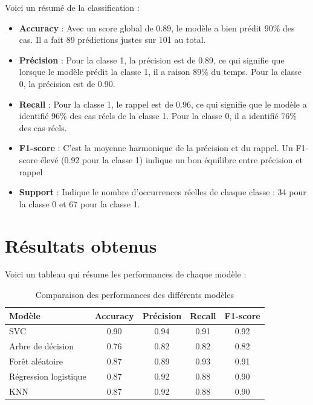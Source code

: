 Voici un résumé de la classification :
\begin{itemize}
	\item \textbf{Accuracy} : Avec un score global de 0.89, le modèle a bien prédit 90\% des cas. Il a fait 89 prédictions justes sur 101 au total.
	\item \textbf{Précision} : Pour la classe 1, la précision est de 0.89, ce qui signifie que lorsque le modèle prédit la classe 1, il a raison 89\% du temps. Pour la classe 0, la précision est de 0.90.
	\item \textbf{Recall} : Pour la classe 1, le rappel est de 0.96, ce qui signifie que le modèle a identifié 96\% des cas réels de la classe 1. Pour la classe 0, il a identifié 76\% des cas réels.
	\item \textbf{F1-score} : C'est la moyenne harmonique de la précision et du rappel. Un F1-score élevé (0.92 pour la classe 1) indique un bon équilibre entre précision et rappel
	\item \textbf{Support} : Indique le nombre d'occurrences réelles de chaque classe : 34 pour la classe 0 et 67 pour la classe 1.
\end{itemize}




\section{Résultats obtenus}
Voici un tableau qui résume les performances de chaque modèle :

\begin{table}[H]
	\centering
	\begin{tabular}{lcccc}
		\hline
		\textbf{Modèle} & \textbf{Accuracy} & \textbf{Précision} & \textbf{Recall} & \textbf{F1-score} \\
		\hline
		SVC & 0.90 & 0.94 & 0.91 & 0.92 \\
		Arbre de décision & 0.76 & 0.82 & 0.82 & 0.82 \\
		Forêt aléatoire & 0.87 & 0.89 & 0.93 & 0.91 \\
		Régression logistique & 0.87 & 0.92 & 0.88 & 0.90 \\
		KNN & 0.87 & 0.92 & 0.88 & 0.90 \\
		\hline
	\end{tabular}
	\caption{Comparaison des performances des différents modèles}
\end{table}

